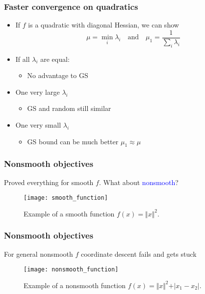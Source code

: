 \documentclass[aspectratio=149]{beamer}
\begin{document}
\begin{frame}
  \frametitle{Faster convergence on quadratics}
  \begin{itemize}
    \item If $f$ is a quadratic with diagonal Hessian, we can show
          \begin{equation}
            \mu = \min_i \lambda_i \quad \text{and} \quad \mu_1 = \frac{1}{\sum_{i}^{} \lambda_i}
          \end{equation}
    \item If all $\lambda_i$ are equal:
          \begin{itemize}
            \item No advantage to GS
          \end{itemize}
    \item One very large $\lambda_i$
          \begin{itemize}
            \item GS and random still similar
          \end{itemize}
    \item One very small $\lambda_i$
          \begin{itemize}
            \item GS bound can be much better $\mu_1 \approx \mu$
          \end{itemize}
  \end{itemize}

\end{frame}


\begin{frame}
  \frametitle{Nonsmooth objectives}
  Proved everything for smooth $f$. What about \textcolor{blue}{nonsmooth}?
  \begin{figure}[ht]
    \centering
    \texttt{[image: smooth\_function]}
    \caption{Example of a smooth function $f(x)= \Vert x \Vert^2$.}
  \end{figure}
\end{frame}


\begin{frame}
  \frametitle{Nonsmooth objectives}
  For general nonsmooth $f$ coordinate descent fails and gets stuck
  \begin{figure}[ht]
    \centering
    \texttt{[image: nonsmooth\_function]}
    \caption{Example of a nonsmooth function $f(x)= \Vert x \Vert^2 + \vert x_1 - x_2 \vert$.}
  \end{figure}
\end{frame}
\end{document}
